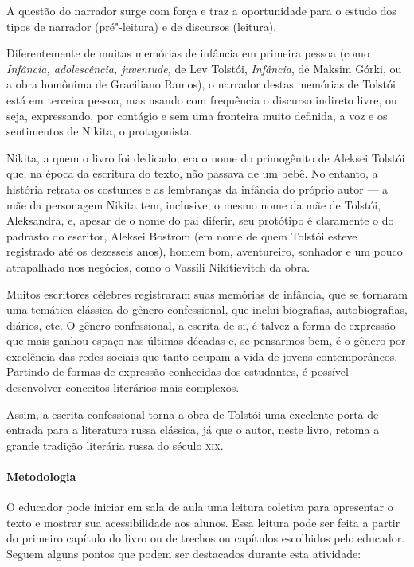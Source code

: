 \documentclass[11pt]{extarticle}
\begin{document}
A questão do narrador surge com força e traz a oportunidade para o
estudo dos tipos de narrador (pré"-leitura) e de discursos (leitura).

Diferentemente de muitas memórias de infância em primeira pessoa (como
\emph{Infância, adolescência, juventude,} de Lev Tolstói,
\emph{Infância}, de Maksim Górki, ou a obra homônima de Graciliano
Ramos), o narrador destas memórias de Tolstói está em terceira pessoa,
mas usando com frequência o discurso indireto livre, ou seja,
expressando, por contágio e sem uma fronteira muito definida, a voz e os
sentimentos de Nikita, o protagonista.

Nikita, a quem o livro foi dedicado, era o nome do primogênito de
Aleksei Tolstói que, na época da escritura do texto, não passava de um
bebê. No entanto, a história retrata os costumes e as lembranças da infância do
próprio autor --- a mãe da personagem Nikita tem, inclusive, o mesmo
nome da mãe de Tolstói, Aleksandra, e, apesar de o nome do pai diferir,
seu protótipo é claramente o do padrasto do escritor, Aleksei Bostrom
(em nome de quem Tolstói esteve registrado até os dezesseis anos), homem
bom, aventureiro, sonhador e um pouco atrapalhado nos negócios, como o
Vassíli Nikítievitch da obra.

Muitos escritores célebres registraram suas memórias de infância, que se
tornaram uma temática clássica do gênero confessional, que inclui
biografias, autobiografias, diários, etc. O gênero confessional, a
escrita de si, é talvez a forma de expressão que mais ganhou espaço nas
últimas décadas e, se pensarmos bem, é o gênero por excelência das redes
sociais que tanto ocupam a vida de jovens contemporâneos. Partindo de
formas de expressão conhecidas dos estudantes, é possível desenvolver
conceitos literários mais complexos.

Assim, a escrita confessional torna a obra de Tolstói uma excelente
porta de entrada para a literatura russa clássica, já que o autor, neste
livro, retoma a grande tradição literária russa do século \textsc{xix}.

\paragraph{Metodologia}
O educador pode iniciar em sala de aula uma leitura coletiva para
apresentar o texto e mostrar sua acessibilidade aos alunos. Essa leitura
pode ser feita a partir do primeiro capítulo do livro ou de trechos ou
capítulos escolhidos pelo educador. Seguem alguns pontos que podem ser
destacados durante esta atividade:
\end{document}
